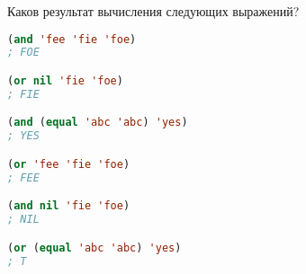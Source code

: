 Каков результат вычисления следующих выражений?

\begin{lstlisting}[language=Lisp]
(and 'fee 'fie 'foe)
; FOE

(or nil 'fie 'foe)
; FIE

(and (equal 'abc 'abc) 'yes)
; YES

(or 'fee 'fie 'foe)
; FEE

(and nil 'fie 'foe)
; NIL

(or (equal 'abc 'abc) 'yes)
; T
\end{lstlisting}

